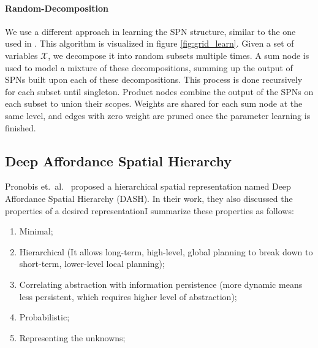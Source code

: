 \documentclass[10pt, titlepage]{article}
\theoremstyle{definition}
\begin{document}
\paragraph{Random-Decomposition}\label{sc:rand}
We use a different approach in learning the SPN structure, similar to the one used in \cite{pronobis2016learning}. This algorithm is visualized in figure \ref{fig:grid_learn}. Given a set of variables $\mathcal{X}$, we decompose it into random subsets multiple times. A sum node is used to model a mixture of these decompositions, summing up the output of SPNs built upon each of these decompositions. This process is done recursively for each subset until singleton. Product nodes combine the output of the SPNs on each subset to union their scopes. Weights are shared for each sum node at the same level, and edges with zero weight are pruned once the parameter learning is finished.

\subsection{Deep Affordance Spatial Hierarchy}\label{section:dash}

Pronobis et.~al.~\cite{pronobis2017deep} proposed a hierarchical spatial representation named Deep Affordance Spatial Hierarchy (DASH). In their work, they also discussed the properties of a desired representationI summarize these properties as follows: 

\begin{enumerate}[label=(\arabic*)]
    \item Minimal;
    \item Hierarchical (It allows long-term, high-level, global planning to break down to short-term, lower-level local planning);
    \item Correlating abstraction with information persistence (more dynamic means less persistent, which requires higher level of abstraction);
    \item Probabilistic;
    \item Representing the unknowns;
\end{enumerate}
\end{document}
